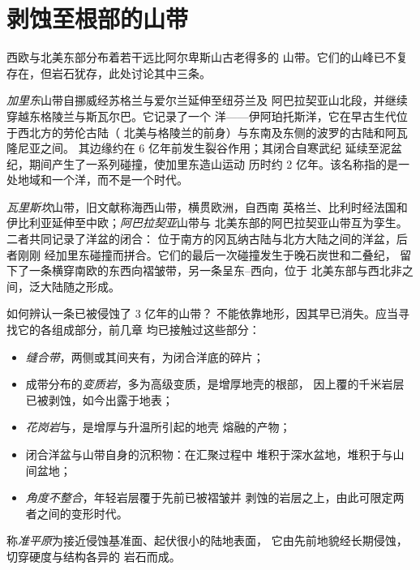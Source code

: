 \section{剥蚀至根部的山带}\label{sec:b2:wilson-cycle:old}

西欧与北美东部分布着若干远比阿尔卑斯山古老得多的
山带。它们的山峰已不复存在，但岩石犹存，此处讨论其中三条。

\emph{加里东}山带自挪威经苏格兰与爱尔兰延伸至纽芬兰及
阿巴拉契亚山北段，并继续穿越东格陵兰与斯瓦尔巴。它记录了一个
洋——伊阿珀托斯洋，它在早古生代位于西北方的劳伦古陆（
北美与格陵兰的前身）与东南及东侧的波罗的古陆和阿瓦隆尼亚之间。
其边缘约在 6 亿年前发生裂谷作用；其闭合自寒武纪
延续至泥盆纪，期间产生了一系列碰撞，使加里东造山运动
历时约 2 亿年。该名称指的是一处地域和一个洋，而不是一个时代。

\emph{瓦里斯坎}山带，旧文献称海西山带，横贯欧洲，自西南
英格兰、比利时经法国和伊比利亚延伸至中欧；\emph{阿巴拉契亚}山带与
北美东部的阿巴拉契亚山带互为孪生。二者共同记录了洋盆的闭合：
位于南方的冈瓦纳古陆与北方大陆之间的洋盆，后者刚刚
经加里东碰撞而拼合。它们的最后一次碰撞发生于晚石炭世和二叠纪，
留下了一条横穿南欧的东西向褶皱带，另一条呈东–西向，位于
北美东部与西北非之间，泛大陆随之形成。

如何辨认一条已被侵蚀了 3 亿年的山带？
不能依靠地形，因其早已消失。应当寻找它的各组成部分，前几章
均已接触过这些部分：
\begin{itemize}
\item \emph{缝合带}，两侧或其间夹有\emph{}，为闭合洋底的碎片；
\item 成带分布的\emph{变质岩}，多为高级变质，是增厚地壳的根部，
因上覆的千米岩层已被剥蚀，如今出露于地表；
\item \emph{花岗岩}与\emph{}，是增厚与升温所引起的地壳
熔融的产物；
\item 闭合洋盆与山带自身的沉积物：\emph{}在汇聚过程中
堆积于深水盆地，\emph{}堆积于与山间盆地；
\item \emph{角度不整合}，年轻岩层覆于先前已被褶皱并
剥蚀的岩层之上，由此可限定两者之间的变形时代。
\end{itemize}

\begin{definition}[准平原]\label{def:b2:wilson-cycle:peneplain}
称\emph{准平原}为接近侵蚀基准面、起伏很小的陆地表面，
它由先前地貌经长期侵蚀，切穿硬度与结构各异的
岩石而成。
\end{definition}

